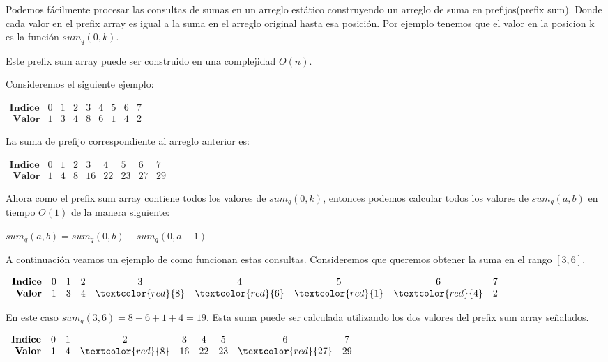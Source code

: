 Podemos fácilmente procesar las consultas de sumas en un arreglo estático construyendo un arreglo de suma en prefijos(prefix sum). Donde cada valor en el prefix array es igual a la suma en el arreglo original hasta esa posición. Por ejemplo tenemos que el valor en la posicion k es la función $sum_{q}(0,k)$.

Este prefix sum array puede ser construido en una complejidad $O(n)$.

Consideremos el siguiente ejemplo:

$\begin{array}{ccccccccc}
 \textbf{Indice}	& 0 &  1 & 2 & 3 & 4 & 5 & 6 & 7 \\ 
	\textbf{ Valor} & 1	& 3 & 4 & 8 & 6 & 1 & 4 & 2 
\end{array} $

La suma de prefijo correspondiente al arreglo anterior es:

$\begin{array}{ccccccccc}
	\textbf{Indice}	& 0&  1 & 2 & 3 & 4 & 5 & 6 & 7 \\ 
   \textbf{ Valor} &	1	& 4 & 8 & 16 & 22 & 23 & 27 & 29 
\end{array}$ 

Ahora como el prefix sum array contiene todos los valores de $sum_{q}(0,k)$, entonces podemos calcular todos los valores de $sum_{q}(a,b)$ en tiempo $O(1)$ de la manera siguiente:

$ sum_{q}(a,b)= sum_{q}(0,b) - sum_{q}(0,a-1) $


A continuación veamos un ejemplo de como funcionan estas consultas. Consideremos que queremos obtener la suma en el rango $[3,6]$.

$\begin{array}{ccccccccc}
\textbf{Indice}	&	0&  1 & 2 & 3 & 4 & 5 & 6 & 7 \\ 
\textbf{ Valor} & 1	& 3 & 4 & \textcolor{red}{8} & \textcolor{red}{6} & \textcolor{red}{1} & \textcolor{red}{4} & 2 
\end{array} $

En este caso $ sum_{q} (3,6) = 8 + 6 + 1 + 4 = 19$. Esta suma puede ser calculada utilizando los dos valores del prefix sum array señalados.

$\begin{array}{ccccccccc}
\textbf{Indice}	&	0&  1 & 2 & 3 & 4 & 5 & 6 & 7 \\ 
\textbf{ Valor} &	1	& 4 & \textcolor{red}{8} & 16 & 22 & 23 & \textcolor{red}{27} & 29 
\end{array} $

